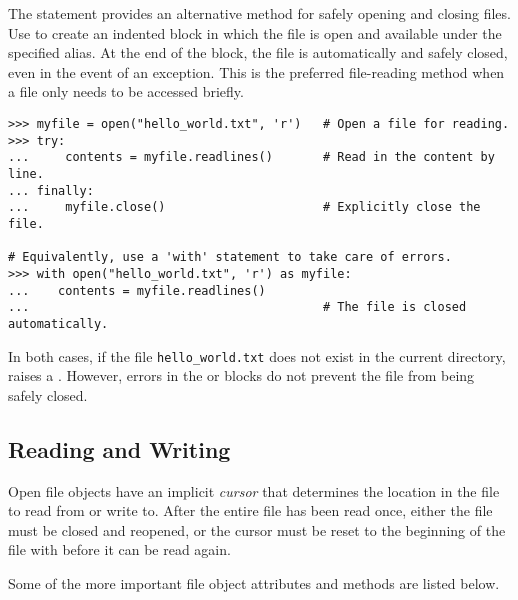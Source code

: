 The  statement provides an alternative method for safely opening and closing files.
Use  to create an indented block in which the file is open and available under the specified alias.
At the end of the block, the file is automatically and safely closed, even in the event of an exception.
This is the preferred file-reading method when a file only needs to be accessed briefly.

\begin{lstlisting}
>>> myfile = open("hello_world.txt", 'r')   # Open a file for reading.
>>> try:
...     contents = myfile.readlines()       # Read in the content by line.
... finally:
...     myfile.close()                      # Explicitly close the file.

# Equivalently, use a 'with' statement to take care of errors.
>>> with open("hello_world.txt", 'r') as myfile:
...    contents = myfile.readlines()
...                                         # The file is closed automatically.
\end{lstlisting}

In both cases, if the file \texttt{hello\_world.txt} does not exist in the current directory,  raises a .
However, errors in the  or  blocks do not prevent the file from being safely closed.

\subsection*{Reading and Writing} %

Open file objects have an implicit \emph{cursor} that determines the location in the file to read from or write to.
After the entire file has been read once, either the file must be closed and reopened, or the cursor must be reset to the beginning of the file with  before it can be read again.

Some of the more important file object attributes and methods are listed below.

